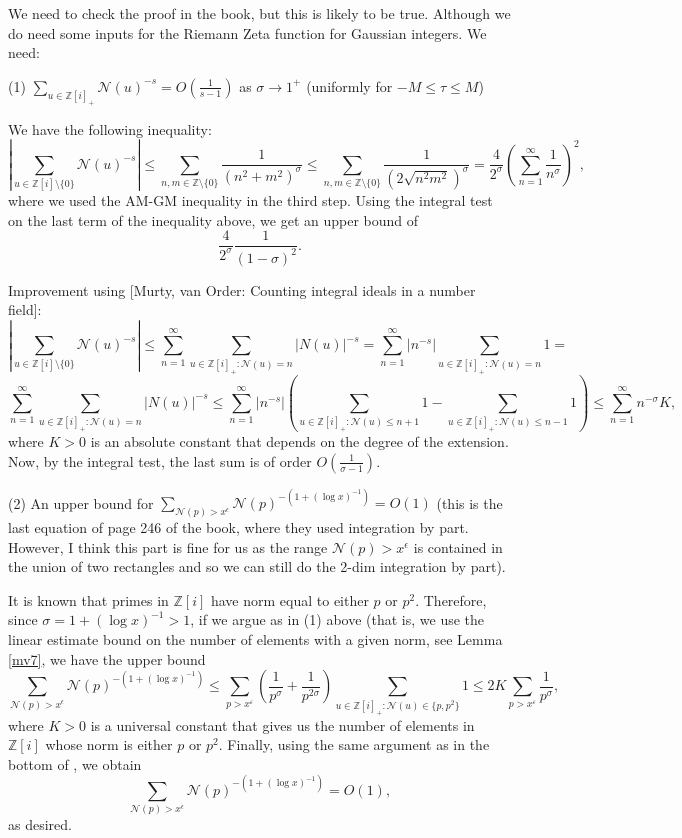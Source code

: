 \documentclass[11pt]{amsart}
\theoremstyle{definition}
\newcommand{\NN}{{\mathcal N}}
\newcommand{\Q}{{\mathbb Q}}
\newcommand{\Z}{{\mathbb Z}}
\newcommand{\e}{\epsilon}
\begin{document}
\iffalse

We need to check the proof in the book, but this is likely to be true. Although we do need some inputs for the Riemann Zeta function for Gaussian integers. We need:

(1) $\sum_{u\in\Z[i]_{+}}\NN(u)^{-s}=O(\frac{1}{s-1})$ as $\sigma\to 1^+$ (uniformly for $-M\leq \tau\leq M$)
{\color{red}
We have the following inequality:
\[
\left|\sum_{u \in \Z[i]\setminus{\{0\}}} \NN(u)^{-s}\right| \leq \sum_{n,m \in \Z \setminus \{0\}} \frac{1}{(n^2+m^2)^{\sigma}} \leq \sum_{n,m \in \Z \setminus \{0\}} \frac{1}{(2\sqrt{n^2m^2})^{\sigma}}=\frac{4}{2^{\sigma}}\left(\sum_{n=1}^{\infty}\frac{1}{n^{\sigma}}\right)^2,
\]
where we used the AM-GM inequality in the third step. Using the integral test on the last term of the inequality above, we get an upper bound of
\[
\frac{4}{2^{\sigma}}\frac{1}{(1-\sigma)^2}.
\]


Improvement using [Murty, van Order: Counting integral ideals in a number field]:
\[
\left|\sum_{u \in \Z[i]\setminus{\{0\}}} \NN(u)^{-s}\right| \leq
\sum_{n=1}^{\infty} \sum_{u \in \Z[i]_+ : \NN(u)=n} |N(u)|^{-s} = \sum_{n=1}^{\infty} |n^{-s}| \sum_{u \in \Z[i]_+ : \NN(u) = n} 1 =
\]
\[\sum_{n=1}^{\infty} \sum_{u \in \Z[i]_+ : \NN(u)=n} |N(u)|^{-s} \leq \sum_{n=1}^{\infty} |n^{-s}| \left(\sum_{u \in \Z[i]_+ : \NN(u) \leq n+1} 1-\sum_{u \in \Z[i]_+ : \NN(u) \leq n-1} 1  \right) \leq \sum_{n=1}^{\infty} n^{-\sigma} K,
\]
where $K>0$ is an absolute constant that depends on the degree of the extension. Now, by the integral test, the last sum is of order $O\left( \frac{1}{\sigma-1}\right)$.


}
(2) An upper bound for $\sum_{\NN(p)>x^{\e}}\NN(p)^{-(1+(\log x)^{-1})}=O(1)$ (this is the last equation of page 246 of the book, where they used integration by part. However, I think this part is fine for us as the range $\NN(p)>x^{\e}$ is contained in the union of two rectangles and so we can still do the 2-dim integration by part).
{\color{red}
It is known that primes in $\Z[i]$ have norm equal to either $p$ or $p^2$. Therefore, since $\sigma=1+(\log x)^{-1}>1$, if we argue as in (1) above (that is, we use the linear estimate bound on the number of elements with a given norm, see Lemma \ref{mv7}, we have the upper bound
\[
\sum_{\NN(p)>x^{\e}}\NN(p)^{-(1+(\log x)^{-1})} \leq \sum_{p>x^{\varepsilon}}\left( \frac{1}{p^{\sigma}}+\frac{1}{p^{2\sigma}}\right)\sum_{u \in \Z[i]_+ : \NN(u) \in \{p,p^2\}} 1\leq 2K \sum_{p>x^{\varepsilon}}\frac{1}{p^{\sigma}},
\]
where $K>0$ is a universal constant that gives us the number of elements in $\Z[i]$ whose norm is either $p$ or $p^2$. Finally, using the same argument as in the bottom of \cite[p. 246]{E79book}, we obtain
\[
\sum_{\NN(p)>x^{\e}}\NN(p)^{-(1+(\log x)^{-1})}=O(1),
\]
as desired.

}
\end{document}
